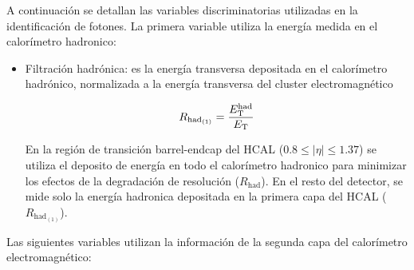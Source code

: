 A continuación se detallan las variables discriminatorias utilizadas en la identificación de fotones. La primera
 variable utiliza la energía medida en el calorímetro hadronico:

\begin{itemize}\itemsep0.2cm\parskip0.2cm

\item Filtración hadrónica: es la energía transversa depositada en el
  calorímetro hadrónico, normalizada a la energía transversa del cluster
  electromagnético

  \begin{equation}
    R_{\mathrm{had}_{(1)}} = \frac{E_{\mathrm{T}}^{\mathrm{had}}}{E_{\mathrm{T}}}
  \end{equation}

En la región de transición barrel-endcap del HCAL ($0.8\leq |\eta| \leq 1.37$) se utiliza
el deposito de energía en todo el calorímetro hadronico para minimizar los efectos de la
degradación de resolución ($R_{\mathrm{had}}$). En el resto del detector, se mide solo la
energía hadronica depositada en la primera capa del HCAL ($R_{\mathrm{had}_{(1)}}$).
  \end{itemize}

Las siguientes variables utilizan la información de la segunda capa del calorímetro electromagnético:

